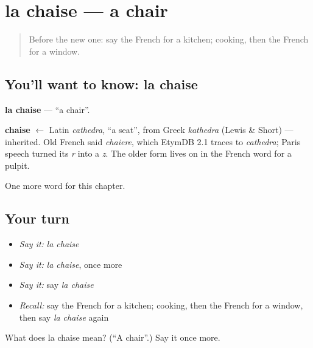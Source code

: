 \section[la chaise]{la chaise — a chair}

\label{lesson:FR-C73-chaise}



\begin{quote}
Before the new one: say the French for a kitchen; cooking, then the French for a window.
\end{quote}

\subsection*{You'll want to know: la chaise}
\textbf{la chaise} — \textquotedblleft{}a chair\textquotedblright{}.

\begin{cousinweb}
\textbf{chaise} $\leftarrow$ Latin \emph{cathedra}, \textquotedblleft{}a seat\textquotedblright{}, from Greek \emph{kathedra} (Lewis \& Short) — inherited. Old French said \emph{chaiere}, which EtymDB 2.1 traces to \emph{cathedra}; Paris speech turned its \emph{r} into a \emph{z}. The older form lives on in the French word for a pulpit.
\end{cousinweb}

\begin{grammarlens}[title={What you've built}]
One more word for this chapter.
\end{grammarlens}

\subsection*{Your turn}
\begin{itemize}
\raggedright
  \item \emph{Say it:} \emph{la chaise}
  \item \emph{Say it:} \emph{la chaise}, once more
  \item \emph{Say it:} say \emph{la chaise}
  \item \emph{Recall:} say the French for a kitchen; cooking, then the French for a window, then say \emph{la chaise} again
\end{itemize}

\begin{tcolorbox}[breakable,colback=teal!4,colframe=teal!35!black,title={Before you move on}]
What does la chaise mean? (\textquotedblleft{}A chair\textquotedblright{}.) Say it once more.
\end{tcolorbox}
